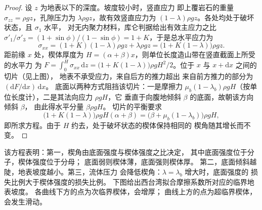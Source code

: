 \begin{proof}
设 $z$ 为地表以下的深度。坡度较小时，竖直应力
即上覆岩石的重量 $\sigma_{zz} = \rho g z$，孔隙压力为
$\lambda\rho g z$，故有效竖直应力为
$(1 - \lambda)\rho g z$。各处均处于破坏状态，且 $\sigma_1$ 水平，
对无内聚力材料，库仑判据给出有效主应力之比
$\sigma'_1/\sigma'_3 = (1 + \sin\phi)/(1 -
\sin\phi) = 1 + K$，于是总水平应力为
\[
  \sigma_{xx} = (1 + K)(1 - \lambda)\rho g z + \lambda\rho g z
  = \bigl(1 + K(1 - \lambda)\bigr)\rho g z .
\]
距前缘 $x$ 处，楔体厚度为 $H = (\alpha +
\beta)x$，则单位长度造山带在竖直截面上所受的水平力
为 $F = \int_0^H \sigma_{xx}\,\mathrm dz = \bigl(1 + K(1 -
\lambda)\bigr)\rho g H^2/2$。位于 $x$ 与 $x + \mathrm dx$ 之间的切片（见上图），
地表不承受应力，来自后方的推力超出
来自前方推力的部分为 $(\mathrm dF/\mathrm dx)\,\mathrm dx$。
底面以两种方式阻挡该切片：一是摩擦力 $\mu_b(1 -
\lambda_b)\rho g H$（按单位长度计），二是其法向应力 $\rho g H$，它
垂直于向腹地倾斜 $\beta$ 的底面，故朝该方向倾斜 $\beta$，
由此得水平分量 $\beta\rho g H$。
切片的平衡要求
\[
  \bigl(1 + K(1 - \lambda)\bigr)\rho g H(\alpha + \beta)
  = \bigl(\beta + \mu_b(1 - \lambda_b)\bigr)\rho g H ,
\]
即所求方程。由于 $H$ 约去，处于破坏状态的楔体保持相同的
楔角随其增长而不变。
\end{proof}

该方程表明：第一，楔角由底面强度与楔体强度之比决定，
其中底面强度位于分子，楔体强度位于分母；
底面弱则楔体薄，底面强则楔体厚。
第二，底面倾斜越陡，地表坡度越小。第三，流体压力
会降低楔角：$\lambda = \lambda_b$ 增大时，底面强度的
损失比例大于楔体强度的损失比例。
下图给出西台湾拟合摩擦系数所对应的临界地表坡度。
各曲线下方的点为次临界楔体，会增厚；
曲线上方的点为超临界楔体，会发生滑动。

